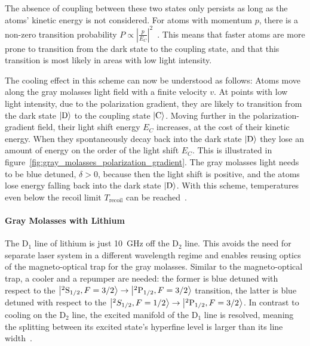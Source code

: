 The absence of coupling between these two states only persists as long as the atoms' kinetic energy is not considered. For atoms with momentum $p$, there is a non-zero transition probability $P \propto \left|\frac{p}{E_C} \right|^2$~\cite{weidemuller_novel_1994}. This means that faster atoms are more prone to transition from the dark state to the coupling state, and that this transition is most likely in areas with low light intensity.

The cooling effect in this scheme can now be understood as follows: Atoms move along the gray molasses light field with a finite velocity $v$. At points with low light intensity, due to the polarization gradient, they are likely to transition from the dark state $\Ket{\text{D}}$ to the coupling state $\Ket{\text{C}}$. Moving further in the polarization-gradient field, their light shift energy $E_C$ increases, at the cost of their kinetic energy. When they spontaneously decay back into the dark state $\Ket{\text{D}}$ they lose an amount of energy on the order of the light shift $E_C$. This is illustrated in figure~\ref{fig:gray_molasses_polarization_gradient}. The gray molasses light needs to be blue detuned, $\delta > 0$, because then the light shift is positive, and the atoms lose energy falling back into the dark state $\Ket{\text{D}}$. With this scheme,  temperatures even below the recoil limit $T_\text{recoil}$ can be reached~\cite{weidemuller_novel_1994,gerken_gray_2016}.


\paragraph{Gray Molasses with Lithium} The D$_1$ line of lithium is just \SI{10}{\giga\hertz} off the D$_2$ line. This avoids the need for separate laser system in a different wavelength regime and  enables reusing optics of the magneto-optical trap for the gray molasses. Similar to the magneto-optical trap, a cooler and a repumper are needed: the former is blue detuned with respect to the $\Ket{^2\text{S}_{1/2}, F = 3/2} \rightarrow \Ket{^2\text{P}_{1/2}, F = 3/2}$ transition, the latter is blue detuned with respect to the $\Ket{^2S_{1/2}, F = 1/2} \rightarrow \Ket{^2\text{P}_{1/2}, F = 3/2}$. In contrast to cooling on the D$_2$ line, the excited manifold of the D$_1$ line is resolved, meaning the splitting between its excited state's hyperfine level is larger than its line width~\cite{gerken_gray_2016}.

